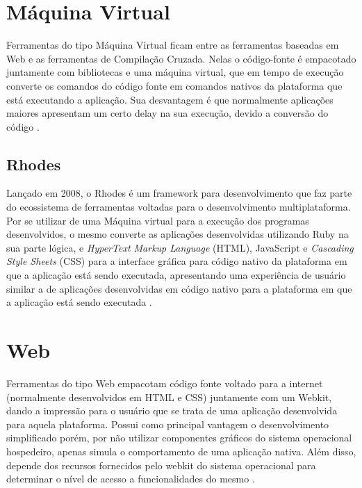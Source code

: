 \section{Máquina Virtual}
Ferramentas do tipo Máquina Virtual ficam entre as ferramentas baseadas em Web e as ferramentas de Compilação Cruzada. Nelas o código-fonte é empacotado juntamente com bibliotecas e uma máquina virtual, que em tempo de execução converte os comandos do código fonte em comandos nativos da plataforma que está executando a aplicação. Sua desvantagem é que normalmente aplicações maiores apresentam um certo delay na sua execução, devido a conversão do código
\cite{CrossPlatformMobileDevelopment2011}.

\subsection{Rhodes}
Lançado em 2008, o Rhodes é um framework para desenvolvimento que faz parte do ecossistema de ferramentas voltadas para o desenvolvimento multiplataforma. Por se utilizar de uma Máquina virtual para a execução dos programas desenvolvidos, o mesmo converte as aplicações desenvolvidas utilizando Ruby na sua parte lógica, e \emph{HyperText Markup Language} (HTML), JavaScript e \emph{Cascading Style Sheets} (CSS) para a interface gráfica para código nativo da plataforma em que a aplicação está sendo executada, apresentando uma experiência de usuário similar a de aplicações desenvolvidas em código nativo para a plataforma em que a aplicação está sendo executada
\cite{CrossPlatformMobileDevelopment2011}.

\section{Web}
Ferramentas do tipo Web empacotam código fonte voltado para a internet (normalmente desenvolvidos em HTML e CSS) juntamente com um Webkit, dando a impressão para o usuário que se trata de uma aplicação desenvolvida para aquela plataforma. Possui como principal vantagem o desenvolvimento simplificado porém, por não utilizar componentes gráficos do sistema operacional hospedeiro, apenas simula o comportamento de uma aplicação nativa. Além disso, depende dos recursos fornecidos pelo webkit do sistema operacional para determinar o nível de acesso a funcionalidades do mesmo 
\cite{CrossPlatformMobileDevelopment2011}.

